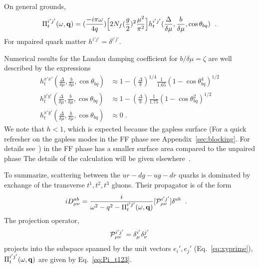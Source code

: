 \documentclass[10pt, aps, prd, superscriptaddress, nofootinbib, 
               amsmath, amssymb, twocolumn,
               preprintnumbers, showpacs,
               raggedbottom,
               floatfix]{revtex4-1}
\newcommand{\calP}{{\cal{P}}}
\newcommand{\bfq}{{\bf{q}}}
\begin{document}
On general grounds, 
\begin{equation}
\begin{split}
\Pi^{i'j'}_t(\omega,\bfq) = (\frac{-i\pi\omega}{4q}) \Bigl[2N_f (\frac{g}{2})^2
\frac{\mu^2}{\pi^2}\Bigr]
h^{i'j'}_t(\frac{\Delta}{\delta\mu},\frac{b}{\delta\mu},\cos\theta_{bq})
~\label{eq:Pi_t123}\;.
\end{split}
\end{equation}
For unpaired quark matter $h^{i'j'} = \delta^{i'j'}$.

Numerical results for the Landau damping coefficient for $b/\delta\mu=\zeta$ 
are well described by the expressions
\begin{equation}
\begin{split}
h^{x'x'}_t(\frac{\Delta}{\delta\mu},\frac{b}{\delta\mu},\cos\theta_{bq}) 
&\approx 1-(\frac{\Delta}{b})^{1/4}\frac{1}{1.65}(1-\cos\theta_{bq}^4)^{1/2}\\
h^{y'y'}_t(\frac{\Delta}{\delta\mu},\frac{b}{\delta\mu},\cos\theta_{bq}) 
&\approx 1-(\frac{\Delta}{b})\frac{1}{1.75}(1-\cos\theta_{bq}^2)^{1/2}\\
h^{x'y'}_t(\frac{\Delta}{\delta\mu},\frac{b}{\delta\mu},\cos\theta_{bq})
&\approx 0\;.
~\label{eq:h_t123}
\end{split}
\end{equation}
We note that $h<1$, which is expected because the gapless surface (For a quick
refresher on the gapless modes in the FF phase see Appendix~\ref{sec:blocking}.
For details
see~\cite{Alford:2000ze,Bowers:2002xr,Bowers:2003ye,Mannarelli:2006}) in the FF
phase has a smaller surface area  compared to the unpaired phase The details of
the calculation will be given elsewhere~\cite{InPreparation}. 

To summarize, scattering between the $ur-dg-ug-dr$ quarks is dominated by
exchange of the transverse $t^1, t^2, t^3$ gluons. Their propagator is of the form  
\begin{equation}
\begin{split}
iD_{\mu\nu}^{ab} &= 
\frac{i}{\omega^2-q^2-\Pi_t^{i'j'}(\omega,\bfq)}
[\calP_{\mu \nu}^{i'j'}]\delta^{ab}~\label{eq:prop123}\;.
\end{split}
\end{equation}
The projection operator,
\begin{equation}
\calP_{\mu \nu}^{i'j'} = \delta_\mu^{i'}\delta_\nu^{j'}
\end{equation}
projects into the subspace spanned by the unit vectors $e_i', e_j'$ 
(Eq.~\ref{eq:xyprime}), $\Pi_t^{i'j'}(\omega,\bfq)$ are given by 
Eq.~\ref{eq:Pi_t123}.
\end{document}
